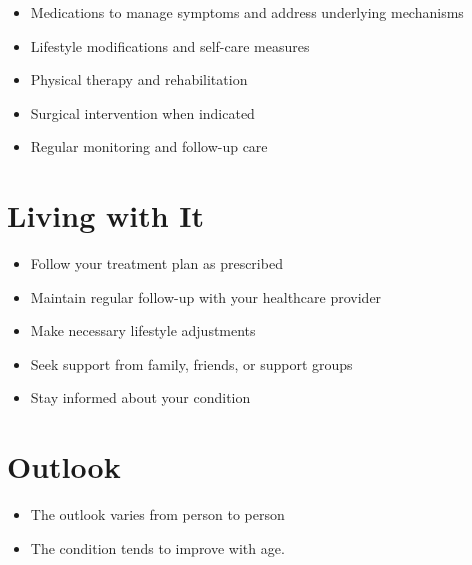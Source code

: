 \begin{itemize}[noitemsep]
  \item Medications to manage symptoms and address underlying mechanisms
  \item Lifestyle modifications and self-care measures
  \item Physical therapy and rehabilitation
  \item Surgical intervention when indicated
  \item Regular monitoring and follow-up care
\end{itemize}
\section{Living with It}
\begin{itemize}[noitemsep]
  \item Follow your treatment plan as prescribed
  \item Maintain regular follow-up with your healthcare provider
  \item Make necessary lifestyle adjustments
  \item Seek support from family, friends, or support groups
  \item Stay informed about your condition
\end{itemize}
\section{Outlook}
\begin{itemize}[noitemsep]
  \item The outlook varies from person to person
  \item The condition tends to improve with age.
\end{itemize}
